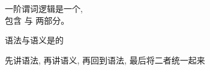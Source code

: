 \begin{frame}{}
  \begin{center}
    一阶谓词逻辑是一个, \\[3pt]
    包含  与  两部分。

    \vspace{0.30cm}
    \vspace{0.30cm}

    \pause
    语法与语义是的

    \pause
    \vspace{0.50cm}
    {\large {} 先讲语法, 再讲语义, 再回到语法, 最后将二者统一起来}
  \end{center}
\end{frame}

